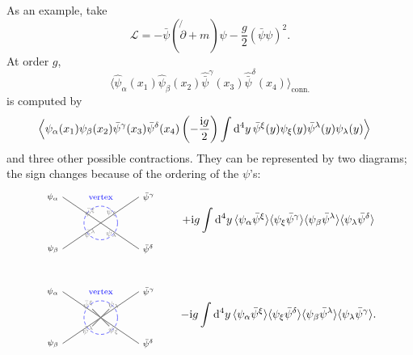 As an example, take
\[
  \mathcal L
  =
  -\bar\psi(\not{\partial}+m)\psi
  -\frac g2(\bar\psi\psi)^2.
\]
At order \(g\),
\[
  \langle
    \widehat\psi_\alpha(x_1)\widehat\psi_\beta(x_2)
    \widehat{\bar\psi}^{\gamma}(x_3)
    \widehat{\bar\psi}^{\delta}(x_4)
  \rangle_{\mathrm{conn.}}
\]
is computed by
\[
\begin{aligned}
  \Bigl\langle&
    \psi_\alpha(x_1)\psi_\beta(x_2)
    \bar\psi^\gamma(x_3)\bar\psi^\delta(x_4)
    \left(-\frac{\mathrm{i} g}{2}\right)
    \int\mathrm{d}^4y\,
    \bar\psi^\xi(y)\psi_\xi(y)
    \bar\psi^\lambda(y)\psi_\lambda(y)
  \Bigr\rangle
\end{aligned}
\]
and three other possible contractions.  They can be represented by two
diagrams; the sign changes because of the ordering of the \(\psi\)'s:
\[
\begin{array}{c@{\qquad}c}
\begin{tikzpicture}[baseline=(current bounding box.center),scale=0.95,
  every node/.style={font=\scriptsize}]
  \coordinate (v) at (0,0);
  \draw[blue,densely dashed] (v) circle (0.55);
  \node[blue] at (0,0.85) {vertex};
  \draw (v) -- ++(-1.25,0.85) node[left] {$\psi_\alpha$};
  \draw (v) -- ++(1.25,0.85) node[right] {$\bar\psi^\gamma$};
  \draw (v) -- ++(-1.25,-0.85) node[left] {$\psi_\beta$};
  \draw (v) -- ++(1.25,-0.85) node[right] {$\bar\psi^\delta$};
  \node[gray] at (-0.35,0.35) {$\bar\psi^\xi$};
  \node[gray] at (0.35,0.35) {$\psi_\xi$};
  \node[gray] at (-0.35,-0.35) {$\bar\psi^\lambda$};
  \node[gray] at (0.35,-0.35) {$\psi_\lambda$};
\end{tikzpicture}
&
\displaystyle
+\ii g\int\dd^4y\,
\langle\psi_\alpha\bar\psi^\xi\rangle
\langle\psi_\xi\bar\psi^\gamma\rangle
\langle\psi_\beta\bar\psi^\lambda\rangle
\langle\psi_\lambda\bar\psi^\delta\rangle
\\[5em]
\begin{tikzpicture}[baseline=(current bounding box.center),scale=0.95,
  every node/.style={font=\scriptsize}]
  \coordinate (v) at (0,0);
  \draw[blue,densely dashed] (v) circle (0.55);
  \node[blue] at (0,0.85) {vertex};
  \draw (v) -- ++(-1.25,0.85) node[left] {$\psi_\alpha$};
  \draw (v) -- ++(1.25,0.85) node[right] {$\bar\psi^\gamma$};
  \draw (v) -- ++(-1.25,-0.85) node[left] {$\psi_\beta$};
  \draw (v) -- ++(1.25,-0.85) node[right] {$\bar\psi^\delta$};
  \draw[gray,thick] (-0.28,0.28) -- (0.28,-0.28);
  \draw[gray,thick] (-0.28,-0.28) -- (0.28,0.28);
  \node[gray] at (-0.42,0.42) {$\bar\psi^\xi$};
  \node[gray] at (0.42,-0.42) {$\psi_\xi$};
  \node[gray] at (-0.42,-0.42) {$\bar\psi^\lambda$};
  \node[gray] at (0.42,0.42) {$\psi_\lambda$};
\end{tikzpicture}
&
\displaystyle
-\ii g\int\dd^4y\,
\langle\psi_\alpha\bar\psi^\xi\rangle
\langle\psi_\xi\bar\psi^\delta\rangle
\langle\psi_\beta\bar\psi^\lambda\rangle
\langle\psi_\lambda\bar\psi^\gamma\rangle .
\end{array}
\]

